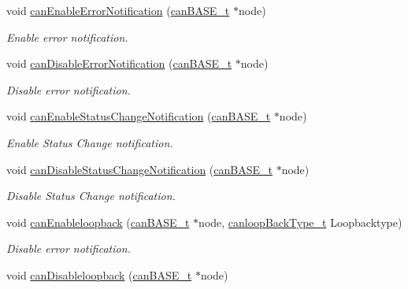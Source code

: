 \begin{DoxyCompactItemize}
void \mbox{\hyperlink{group__CAN_gac7704998743bb22648e947b29a544bae}{can\+Enable\+Error\+Notification}} (\mbox{\hyperlink{reg__can_8h_a54ace0879c28a425474845a63d662c05}{can\+B\+A\+S\+E\+\_\+t}} $\ast$node)
\begin{DoxyCompactList}\small\item\em Enable error notification. \end{DoxyCompactList}\item 
void \mbox{\hyperlink{group__CAN_gaaf364da9e334318c980ff42a40b4b11d}{can\+Disable\+Error\+Notification}} (\mbox{\hyperlink{reg__can_8h_a54ace0879c28a425474845a63d662c05}{can\+B\+A\+S\+E\+\_\+t}} $\ast$node)
\begin{DoxyCompactList}\small\item\em Disable error notification. \end{DoxyCompactList}\item 
void \mbox{\hyperlink{group__CAN_ga0acd0f1c9a17f321a40754a93f2d8696}{can\+Enable\+Status\+Change\+Notification}} (\mbox{\hyperlink{reg__can_8h_a54ace0879c28a425474845a63d662c05}{can\+B\+A\+S\+E\+\_\+t}} $\ast$node)
\begin{DoxyCompactList}\small\item\em Enable Status Change notification. \end{DoxyCompactList}\item 
void \mbox{\hyperlink{group__CAN_ga7d16cc0c633d487a0c6ba6dd0d6aa15a}{can\+Disable\+Status\+Change\+Notification}} (\mbox{\hyperlink{reg__can_8h_a54ace0879c28a425474845a63d662c05}{can\+B\+A\+S\+E\+\_\+t}} $\ast$node)
\begin{DoxyCompactList}\small\item\em Disable Status Change notification. \end{DoxyCompactList}\item 
void \mbox{\hyperlink{group__CAN_gae46d75070d42e6c074c7badf986fe98f}{can\+Enableloopback}} (\mbox{\hyperlink{reg__can_8h_a54ace0879c28a425474845a63d662c05}{can\+B\+A\+S\+E\+\_\+t}} $\ast$node, \mbox{\hyperlink{can_8h_afe14b0f6de1003d9440f90e9df86918a}{canloop\+Back\+Type\+\_\+t}} Loopbacktype)
\begin{DoxyCompactList}\small\item\em Disable error notification. \end{DoxyCompactList}\item 
void \mbox{\hyperlink{group__CAN_ga965046b34f4e45c97de1d08c2ba73cb4}{can\+Disableloopback}} (\mbox{\hyperlink{reg__can_8h_a54ace0879c28a425474845a63d662c05}{can\+B\+A\+S\+E\+\_\+t}} $\ast$node)

\end{DoxyCompactItemize}

